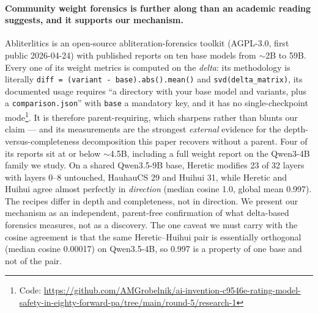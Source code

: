 \documentclass[11pt,letterpaper]{article}
\begin{document}
\paragraph{Community weight forensics is further along than an academic reading suggests, and it supports our mechanism.} Abliterlitics \citep{Sapwell2026} is an open-source abliteration-forensics toolkit (AGPL-3.0, first public 2026-04-24) with published reports on ten base models from ${\sim}$2B to 59B. Every one of its weight metrics is computed on the \emph{delta}: its methodology is literally \texttt{diff = (variant - base).abs().mean()} and \texttt{svd(delta\_matrix)}, its documented usage requires ``a directory with your base model and variants, plus a \texttt{comparison.json}'' with \texttt{base} a mandatory key, and it has no single-checkpoint mode\footnote{Code: \url{https://github.com/AMGrobelnik/ai-invention-c9546e-rating-model-safety-in-eighty-forward-pa/tree/main/round-5/research-1}}. It is therefore parent-requiring, which sharpens rather than blunts our claim --- and its measurements are the strongest \emph{external} evidence for the depth-versus-completeness decomposition this paper recovers without a parent. Four of its reports sit at or below ${\sim}$4.5B, including a full weight report on the Qwen3-4B family we study. On a shared Qwen3.5-9B base, Heretic modifies 23 of 32 layers with layers 0--8 untouched, HauhauCS 29 and Huihui 31, while Heretic and Huihui agree almost perfectly in \emph{direction} (median cosine 1.0, global mean 0.997). The recipes differ in depth and completeness, not in direction. We present our mechanism as an independent, parent-free confirmation of what delta-based forensics measures, not as a discovery. The one caveat we must carry with the cosine agreement is that the same Heretic--Huihui pair is essentially orthogonal (median cosine 0.00017) on Qwen3.5-4B, so 0.997 is a property of one base and not of the pair.
\end{document}
